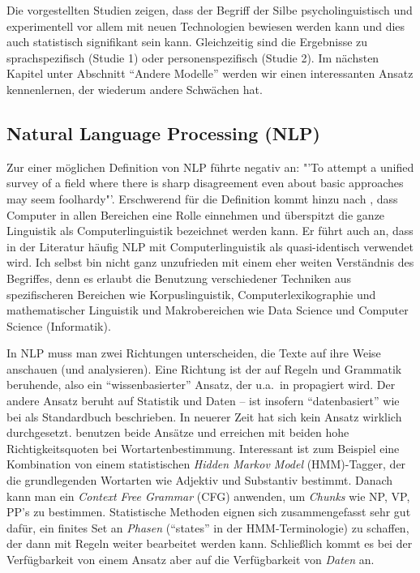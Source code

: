\documentclass[12pt,headsepline,a4paper]{scrartcl}
\begin{document}
Die vorgestellten Studien zeigen, dass der Begriff der Silbe psycholinguistisch und experimentell vor allem mit neuen Technologien bewiesen werden kann und dies auch statistisch signifikant sein kann. Gleichzeitig sind die Ergebnisse zu sprachspezifisch (Studie 1) oder personenspezifisch (Studie 2). Im nächsten Kapitel unter Abschnitt "`Andere Modelle"' werden wir einen interessanten Ansatz kennenlernen, der wiederum andere Schwächen hat.

\subsection{Natural Language Processing (NLP)}
Zur einer möglichen Definition von NLP führte \textcite[1]{grish1989} negativ an: "'To attempt a unified survey of a field where there is sharp disagreement even about basic approaches may seem foolhardy"'. Erschwerend für die Definition kommt hinzu nach \textcite[23]{ooi1998}, dass Computer in allen Bereichen eine Rolle einnehmen und überspitzt die ganze Linguistik als Computerlinguistik bezeichnet werden kann. Er führt auch an, dass in der Literatur häufig NLP mit Computerlinguistik als quasi-identisch verwendet wird.
Ich selbst bin nicht ganz unzufrieden mit einem eher weiten Verständnis des Begriffes, denn es erlaubt die Benutzung verschiedener Techniken aus spezifischeren Bereichen wie Korpuslinguistik, Computerlexikographie und mathematischer Linguistik und Makrobereichen wie Data Science und Computer Science (Informatik).

In NLP muss man zwei Richtungen unterscheiden, die Texte auf ihre Weise anschauen (und analysieren). Eine Richtung ist der auf Regeln und Grammatik beruhende, also ein "`wissenbasierter"' Ansatz, der u.a.\ in \textcite{allen1995} propagiert wird. Der andere Ansatz beruht auf Statistik und Daten -- ist insofern "`datenbasiert"' wie bei \textcite{mann1999} als Standardbuch beschrieben. In neuerer Zeit hat sich kein Ansatz wirklich durchgesetzt. \textcite{bird2009} benutzen beide Ansätze und erreichen mit beiden hohe Richtigkeitsquoten bei Wortartenbestimmung. Interessant ist zum Beispiel eine Kombination von einem statistischen \textit{Hidden Markov Model} (HMM)-Tagger, der die grundlegenden Wortarten wie Adjektiv und Substantiv bestimmt. Danach kann man ein \textit{Context Free Grammar} (CFG) anwenden, um \textit{Chunks} wie NP, VP, PP's zu bestimmen. Statistische Methoden eignen sich zusammengefasst sehr gut dafür, ein finites Set an \textit{Phasen} ("`states"' in der HMM-Terminologie) zu schaffen, der dann mit Regeln weiter bearbeitet werden kann. Schließlich kommt es bei der Verfügbarkeit von einem Ansatz aber auf die Verfügbarkeit von \textit{Daten} an.
\end{document}
